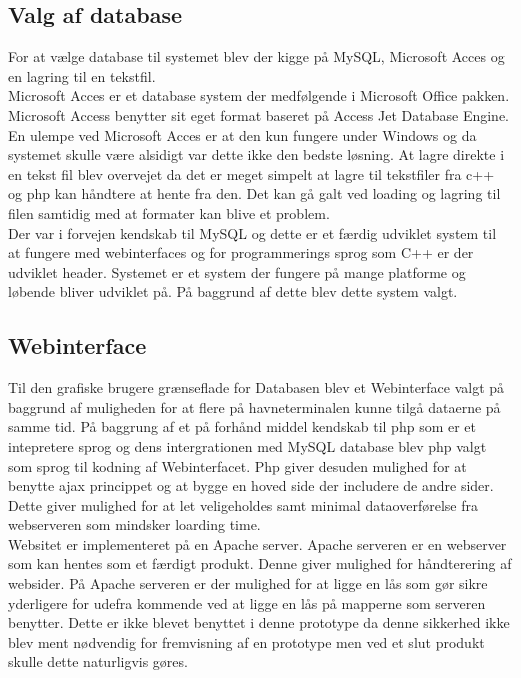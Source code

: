 \subsection{Valg af database}
For at vælge database til systemet blev der kigge på MySQL, Microsoft Acces og en lagring til en tekstfil.\\
Microsoft Acces er et database system der medfølgende i Microsoft Office pakken. Microsoft Access benytter sit eget format baseret på Access Jet Database Engine. En ulempe ved Microsoft Acces er at den kun fungere under Windows og da systemet skulle være alsidigt var dette ikke den bedste løsning. At lagre direkte i en tekst fil blev overvejet da det er meget simpelt at lagre til tekstfiler fra c++ og php kan håndtere at hente fra den. Det kan gå galt ved loading og lagring til filen samtidig med at formater kan blive et problem. \\
Der var i forvejen kendskab til MySQL og dette er et færdig udviklet system til at fungere med webinterfaces og for programmerings sprog som C++ er der udviklet header. Systemet er et system der fungere på mange platforme og løbende bliver udviklet på. På baggrund af dette blev dette system valgt.

\subsection{Webinterface}
Til den grafiske brugere grænseflade for Databasen blev et Webinterface valgt på baggrund af muligheden for at flere på havneterminalen kunne tilgå dataerne på samme tid. På baggrung af et på forhånd middel kendskab til php som er et  intepretere sprog og dens intergrationen med MySQL database blev php valgt som sprog til kodning af Webinterfacet. Php giver desuden mulighed for at benytte ajax princippet og at bygge en hoved side der includere de andre sider. Dette giver mulighed for at let veligeholdes samt minimal dataoverførelse fra webserveren som mindsker loarding time.\\
Websitet er implementeret på en Apache server. Apache serveren er en webserver som kan hentes som et færdigt produkt. Denne giver mulighed for håndterering af websider. På Apache serveren er der mulighed for at ligge en lås som gør sikre yderligere for udefra kommende ved at ligge en lås på mapperne som serveren benytter. Dette er ikke blevet benyttet i denne prototype da denne sikkerhed ikke blev ment nødvendig for fremvisning af en prototype men ved et slut produkt skulle dette naturligvis gøres.


